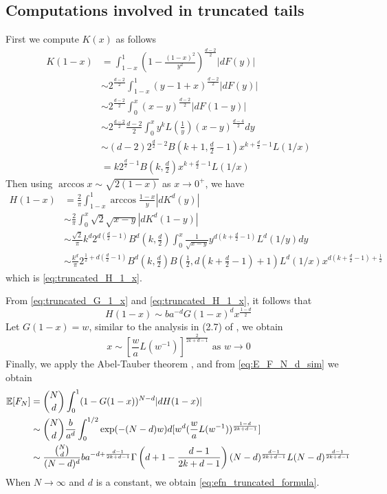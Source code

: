 \documentclass{aptpub}
\def\E{\mathbb{E}}
\begin{document}
\subsection{Computations involved in truncated tails}
First we compute $K(x)$ as follows
\begin{align*}
    K(1-x)  & = \int_{1-x}^1 (1-\frac{(1-x)^2}{y^2})^{\frac{d-2}{2}} |dF(y)| \\
    & \sim 2^{\frac{d-2}{2}} \int_{1-x}^1 (y-1+x)^{\frac{d-2}{2}} |dF(y)| \\
    & \sim 2^{\frac{d-2}{2}} \int_0^x (x-y)^{\frac{d-2}{2}} |dF(1-y)| \\
    & \sim 2^{\frac{d-2}{2}} \frac{d-2}{2} \int_0^x y^k L(\frac{1}{y}) (x-y)^{\frac{d-4}{2}} dy\\
    & \sim (d-2)2^{\frac{d}{2}-2} B(k+1,\frac{d}{2}-1)x^{k+\frac{d}{2}-1}L(1/x)\\
    & = k 2^{\frac{d}{2}-1} B(k, \frac{d}{2}) x^{k+\frac{d}{2}-1} L(1/x) 
\end{align*}
Then using $\arccos x \sim \sqrt{2(1-x)}$ as $x\to 0^+$,
we have
\begin{align*}
     H(1-x) & = \frac{2}{\pi} \int_{1-x}^{1}
     \arccos\frac{1-x}{y}
     |d K^d(y)| \\
     &\sim \frac{2}{\pi}\int_0^x \sqrt{2}\sqrt{x-y} |dK^d(1-y)| \\
     &\sim \frac{\sqrt{2}}{\pi} k^d
     2^{d(\frac{d}{2}-1)} B^d(k, \frac{d}{2})
      \int_0^x \frac{1}{\sqrt{x-y}} y^{d(k+\frac{d}{2}-1)} L^d(1/y) dy\\
     &\sim \frac{k^d}{\pi}
     2^{\frac{1}{2} + d(\frac{d}{2}-1)} B^d(k, \frac{d}{2})
     B\left( \frac{1}{2},
     d(k+\frac{d}{2} -1)+1 \right) L^d(1/x) x^{d(k+\frac{d}{2}-1)+\frac{1}{2}}
\end{align*}
which is \eqref{eq:truncated_H_1_x}.

From \eqref{eq:truncated_G_1_x} and \eqref{eq:truncated_H_1_x}, it follows that
\begin{equation}
    H(1-x) \sim ba^{-d} G(1-x)^d x^{\frac{1-d}{2}}
\end{equation}
Let $G(1-x)=w$, similar to the analysis in (2.7) of
\cite{carnal1970konvexe}, we obtain
\begin{equation*}
     x \sim [\frac{w}{a} L(w^{-1})]^{\frac{2}{2k+d-1}} \textrm{ as } w \to 0
\end{equation*}
Finally, 
we apply the Abel-Tauber theorem
\cite{omey1989abelian}, and from \eqref{eq:E_F_N_d_sim} we obtain
\begin{align}
    \E[F_N] &= \binom{N}{d}\int_0^1 (1 - G(1-x))^{N-d} |dH(1-x)| 
    \notag \\
    & \sim \binom{N}{d} \frac{b}{a^d} \int_0^{1/2} \exp(-(N-d)w) d[w^d (\frac{w}{a} L(w^{-1}))^{\frac{1-d}{2k+d-1}} ]
    \notag \\
    &\sim \frac{\binom{N}{d}}{(N-d)^d} ba^{-d+\frac{d-1}{2k+d-1}}
    \Gamma 
    \left(d+1-\frac{d-1}{2k+d-1}\right)
    (N-d)^{\frac{d-1}{2k+d-1}}
    L(N-d)
    ^{\frac{d-1}{2k+d-1}}
    \label{eq:intermediate_efn_truncated}
\end{align}
When $N\to \infty$ and $d$ is a constant, we obtain \eqref{eq:efn_truncated_formula}.
\end{document}
